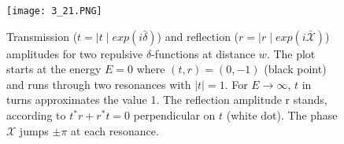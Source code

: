 \begin{figure}[ht]
    \begin{minipage}{0.5\textwidth}
        \centering
        \texttt{[image: 3\_21.PNG]}
    \end{minipage}
    \begin{minipage}{0.5\textwidth}
        \caption{Transmission ($t=\mid t\mid exp(i\bar{\delta})$) and reflection ($r=\mid r\mid exp(i\bar{\mathcal{X}})$) amplitudes for two repulsive $\delta$-functions at distance $w$. The plot starts at the energy $E = 0$ where $(t, r) = (0, -1)$ (black point) and runs through two resonances with $\mid t \mid = 1$. For $E\to\infty$, $t$ in turns approximates the value 1. The reflection amplitude r stands, according to $t^*r+r^*t=0$ perpendicular
        on $t$ (white dot). The phase $\mathcal{X}$
        jumps $\pm\pi$ at each resonance.}
    \end{minipage}
\end{figure}


